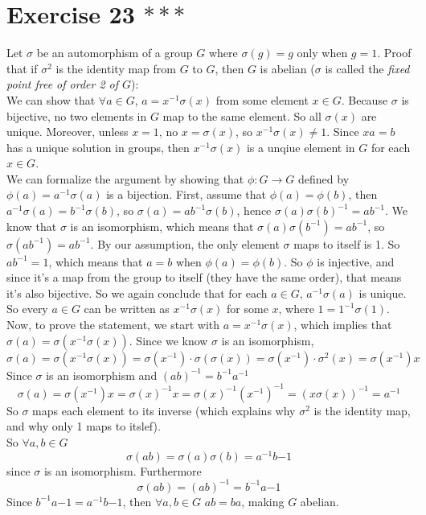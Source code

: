 \documentclass[12pt]{article}
\begin{document}
    \section*{Exercise 23 $***$}
    Let $\sigma$ be an automorphism of a group $G$
    where $\sigma(g) = g$ only when $g = 1$.
    Proof that if $\sigma^2$ is the identity map from $G$ to $G$,
    then $G$ is abelian
    ($\sigma$ is called the \textit{fixed point free of order 2 of $G$}): \\
    We can show that $\forall a \in G$, $a = x^{-1}\sigma(x)$
    from some element $x \in G$.
    Because $\sigma$ is bijective,
    no two elements in $G$ map to the same element.
    So all $\sigma(x)$ are unique.
    Moreover, unless $x = 1$, no $x = \sigma(x)$,
    so $x^{-1}\sigma(x) \neq 1$.
    Since $xa = b$ has a unique solution in groups, 
    then $x^{-1}\sigma(x)$ is a unqiue element in $G$ for each $x \in G$. \\
    We can formalize the argument by showing that $\phi: G \to G$
    defined by $\phi(a) = a^{-1}\sigma(a)$ is a bijection.
    First, assume that $\phi(a) = \phi(b)$,
    then $a^{-1}\sigma(a) = b^{-1}\sigma(b)$,
    so $\sigma(a) = ab^{-1}\sigma(b)$,
    hence $\sigma(a)\sigma(b)^{-1} = ab^{-1}$.
    We know that $\sigma$ is an isomorphism,
    which means that $\sigma(a)\sigma(b^{-1}) = ab^{-1}$,
    so $\sigma(ab^{-1}) = ab^{-1}$.
    By our assumption, the only element $\sigma$ maps to itself is 1.
    So $ab^{-1} = 1$,
    which means that $a = b$ when $\phi(a) = \phi(b)$.
    So $\phi$ is injective,
    and since it's a map from the group to itself (they have the same order),
    that means it's also bijective.
    So we again conclude that for each $a \in G$, $a^{-1}\sigma(a)$ is unique.
    So every $a \in G$ can be written as $x^{-1}\sigma(x)$ for some $x$,
    where $1 = 1^{-1}\sigma(1)$. \\
    Now, to prove the statement, we start with $a = x^{-1}\sigma(x)$,
    which implies that $\sigma(a) = \sigma(x^{-1}\sigma(x))$.
    Since we know $\sigma$ is an isomorphism,
    \[ \sigma(a) = \sigma(x^{-1}\sigma(x))
    = \sigma(x^{-1}) \cdot \sigma(\sigma(x))
    = \sigma(x^{-1}) \cdot \sigma^2(x)
    = \sigma(x^{-1})x \]
    Since $\sigma$ is an isomorphism and $(ab)^{-1} = b^{-1}a^{-1}$
    \[\sigma(a) = \sigma(x^{-1})x
    = \sigma(x)^{-1}x
    = \sigma(x)^{-1}(x^{-1})^{-1}
    = (x\sigma(x))^{-1}
    = a^{-1} \]
    So $\sigma$ maps each element to its inverse
    (which explains why $\sigma^2$ is the identity map, and why only 1
    maps to itslef). \\ 
    So $\forall a, b \in G$
    \[ \sigma(ab) = \sigma(a)\sigma(b) = a^{-1}b{-1} \]
    since $\sigma$ is an isomorphism.
    Furthermore
    \[ \sigma(ab) = (ab)^{-1} = b^{-1}a{-1} \]
    Since $b^{-1}a{-1} = a^{-1}b{-1}$,
    then $\forall a, b \in G$ $ab = ba$,
    making $G$ abelian.
\end{document}
